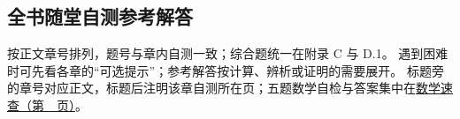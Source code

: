 \subsection{全书随堂自测参考解答}
\label{app:chapter-checks}

按正文章号排列，题号与章内自测一致；综合题统一在附录 C 与 D.1。
遇到困难时可先看各章的“可选提示”；参考解答按计算、辨析或证明的需要展开。
标题旁的章号对应正文，标题后注明该章自测所在页；五题数学自检与答案集中在\hyperref[app:math-entry]{数学速查（第~\pageref*{app:math-entry}~页）}。
\newcommand{\answercheckpage}[1]{\enspace{\mdseries\footnotesize\hyperref[check:#1]{（题目见第~\pageref*{check:#1}~页）}}}

\newcommand{\checkanswer}[2]{%
  \par\smallskip\noindent
  {\sffamily\bfseries\color{blue}题~#1 \textnormal{·} #2}\par\nobreak
  \noindent\ignorespaces
}
\begingroup
\setlength{\parskip}{3pt}
